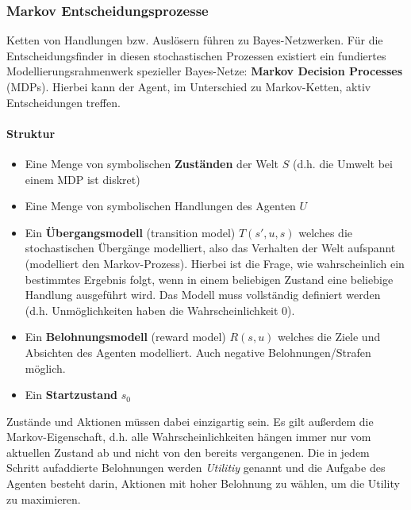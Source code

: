 \subsubsection{Markov Entscheidungsprozesse}
Ketten von Handlungen bzw. Ausl\"osern f\"uhren zu Bayes-Netzwerken. F\"ur die Entscheidungsfinder in diesen stochastischen Prozessen existiert ein fundiertes Modellierungsrahmenwerk spezieller Bayes-Netze: \textbf{Markov Decision Processes} (MDPs). Hierbei kann der Agent, im Unterschied zu Markov-Ketten, aktiv Entscheidungen treffen.

\paragraph{Struktur}
\begin{itemize}
\item Eine Menge von symbolischen \textbf{Zust\"anden} der Welt $S$ (d.h. die Umwelt bei einem MDP ist diskret)
\item Eine Menge von symbolischen Handlungen des Agenten $U$
\item Ein \textbf{\"Ubergangsmodell} (transition model) $T(s', u, s)$ welches die stochastischen \"Uberg\"ange modelliert, also das Verhalten der Welt aufspannt (modelliert den Markov-Prozess). Hierbei ist die Frage, wie wahrscheinlich ein bestimmtes Ergebnis folgt, wenn in einem beliebigen Zustand eine beliebige Handlung ausgeführt wird. Das Modell muss vollständig definiert werden (d.h.     Unmöglichkeiten haben die Wahrscheinlichkeit 0).
\item Ein \textbf{Belohnungsmodell} (reward model) $R(s,u)$ welches die Ziele und Absichten des Agenten modelliert. Auch negative Belohnungen/Strafen möglich. 
\item Ein \textbf{Startzustand} $s_0$
\end{itemize}
Zust\"ande und Aktionen m\"ussen dabei einzigartig sein.
Es gilt au{\ss}erdem die Markov-Eigenschaft, d.h. alle Wahrscheinlichkeiten h\"angen immer nur vom aktuellen Zustand ab und nicht von den bereits vergangenen.
Die in jedem Schritt aufaddierte Belohnungen werden \emph{Utilitiy} genannt und die Aufgabe des Agenten besteht darin, Aktionen mit hoher Belohnung zu w\"ahlen, um die Utility zu maximieren.

